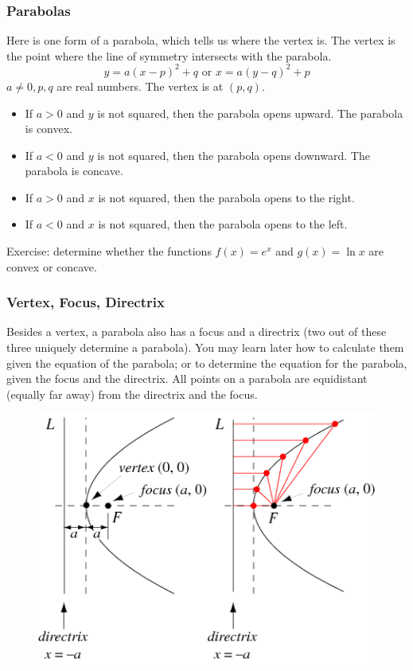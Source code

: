 \documentclass[xcolor=dvipsnames]{beamer}
\begin{document}
\begin{frame}
  \frametitle{Parabolas}
Here is one form of a parabola, which tells us where the
vertex is. The vertex is the point where the line of symmetry
intersects with the parabola.
\begin{equation}
  \label{eq:aizienah}
y=a(x-p)^{2}+q\mbox{ or }x=a(y-q)^{2}+p
\end{equation}
$a\neq{}0,p,q$ are real numbers. The vertex is at $(p,q)$.
\begin{itemize}
\item If $a>0$ and $y$ is not squared, then the parabola opens upward. The parabola is \alert{convex}.
\item If $a<0$ and $y$ is not squared, then the parabola opens downward. The parabola is \alert{concave}.
\item If $a>0$ and $x$ is not squared, then the parabola opens to the right. 
\item If $a<0$ and $x$ is not squared, then the parabola opens to the left. 
\end{itemize}
Exercise: determine whether the functions $f(x)=e^{x}$ and
$g(x)=\ln{}x$ are convex or concave.
\end{frame}

\begin{frame}
  \frametitle{Vertex, Focus, Directrix}
  Besides a \alert{vertex}, a parabola also has a \alert{focus} and a
  \alert{directrix} (two out of these three uniquely determine a
  parabola). You may learn later how to calculate them given the
  equation of the parabola; or to determine the equation for the
  parabola, given the focus and the directrix. All points on a
  parabola are equidistant (equally far away) from the directrix and
  the focus.
  \begin{figure}[h]
    \includegraphics[scale=.45]{./parabola.png}
  \end{figure}
\end{frame}
\end{document}
